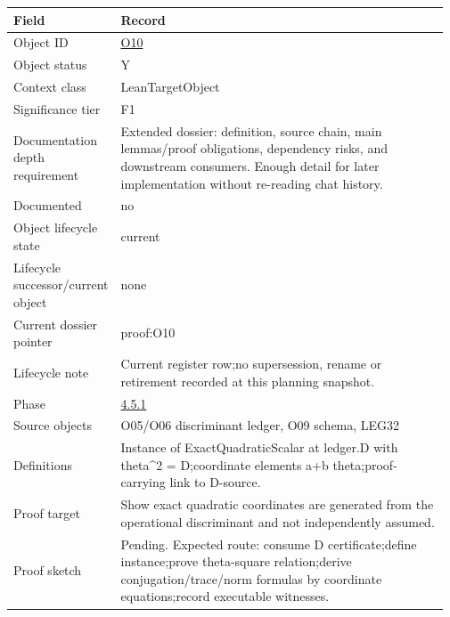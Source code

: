 \begin{longtable}{L{0.16\linewidth} L{0.81\linewidth}}
\hline
\textbf{Field} & \textbf{Record}\\
\hline
Object ID & \hyperlink{object-row-O10}{O10}\\
\hline\addlinespace[0.20em]
Object status & Y\\
\hline\addlinespace[0.20em]
Context class & LeanTargetObject\\
\hline\addlinespace[0.20em]
Significance tier & F1\\
\hline\addlinespace[0.20em]
Documentation depth requirement & Extended dossier: definition, source chain, main lemmas/\allowbreak{}proof obligations, dependency risks, and downstream consumers. Enough detail for later implementation without re-reading chat history.\\
\hline\addlinespace[0.20em]
Documented & no\\
\hline\addlinespace[0.20em]
Object lifecycle state & current\\
\hline\addlinespace[0.20em]
Lifecycle successor/\allowbreak{}current object & none\\
\hline\addlinespace[0.20em]
Current dossier pointer & proof:O10\\
\hline\addlinespace[0.20em]
Lifecycle note & Current register row;\newline no supersession, rename or retirement recorded at this planning snapshot.\\
\hline\addlinespace[0.20em]
Phase & \hyperlink{phase-row-4-5-1}{4.5.1}\\
\hline\addlinespace[0.20em]
Source objects & O05/\allowbreak{}O06 discriminant ledger, O09 schema, LEG32\\
\hline\addlinespace[0.20em]
Definitions & Instance of ExactQuadraticScalar at ledger.D with theta\textasciicircum{}2 = D;\newline coordinate elements a+b theta;\newline proof-carrying link to D-source.\\
\hline\addlinespace[0.20em]
Proof target & Show exact quadratic coordinates are generated from the operational discriminant and not independently assumed.\\
\hline\addlinespace[0.20em]
Proof sketch & Pending. Expected route: consume D certificate;\newline define instance;\newline prove theta-square relation;\newline derive conjugation/\allowbreak{}trace/\allowbreak{}norm formulas by coordinate equations;\newline record executable witnesses.\\

\end{longtable}
